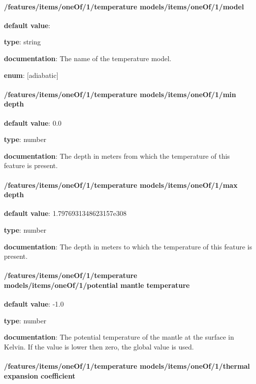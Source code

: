 \paragraph{/features/items/oneOf/1/temperature models/items/oneOf/1/model} \begin{itemized}
\item {\bf default value}: 
\item {\bf type}: string
\item {\bf documentation}: The name of the temperature model.
\item {\bf enum}: [adiabatic]\end{itemized}\paragraph{/features/items/oneOf/1/temperature models/items/oneOf/1/min depth} \begin{itemized}
\item {\bf default value}: 0.0
\item {\bf type}: number
\item {\bf documentation}: The depth in meters from which the temperature of this feature is present.
\end{itemized}\paragraph{/features/items/oneOf/1/temperature models/items/oneOf/1/max depth} \begin{itemized}
\item {\bf default value}: 1.7976931348623157e308
\item {\bf type}: number
\item {\bf documentation}: The depth in meters to which the temperature of this feature is present.
\end{itemized}\paragraph{/features/items/oneOf/1/temperature models/items/oneOf/1/potential mantle temperature} \begin{itemized}
\item {\bf default value}: -1.0
\item {\bf type}: number
\item {\bf documentation}: The potential temperature of the mantle at the surface in Kelvin. If the value is lower then zero, the global value is used.
\end{itemized}\paragraph{/features/items/oneOf/1/temperature models/items/oneOf/1/thermal expansion coefficient} \begin{itemized}

\end{itemized}

